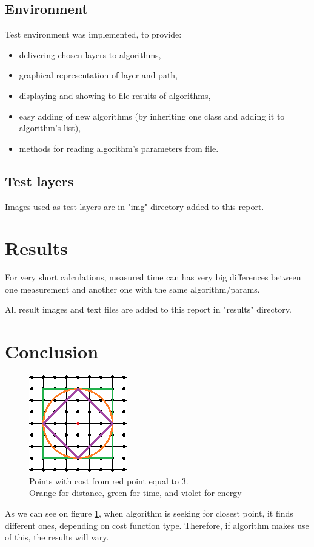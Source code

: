 \documentclass[titlepage]{article}
\begin{document}
\subsection{Environment}
Test environment was implemented, to provide:
\begin{itemize}
\item delivering chosen layers to algorithms,
\item graphical representation of layer and path,
\item displaying and showing to file results of algorithms,
\item easy adding of new algorithms (by inheriting one class and adding it to algorithm's list),
\item methods for reading algorithm's parameters from file.
\end{itemize}

\subsection{Test layers}
Images used as test layers are in "img" directory added to this report.

\section{Results}
For very short calculations, measured time can has very big differences between one measurement and another one with the same algorithm/params.

All result images and text files are added to this report in "results" directory.

\section{Conclusion}
\begin{figure}
\begin{center}
\includegraphics[scale=2]{img/costs}
\end{center}
\caption{Points with cost from red point equal to 3.\\Orange for distance, green for time, and violet for energy}
\label{cost_function_representation}
\end{figure}
As we can see on figure \ref{cost_function_representation}, when algorithm is seeking for closest point, it finds different ones, depending on cost function type. Therefore, if algorithm makes use of this, the results will vary.
\end{document}
